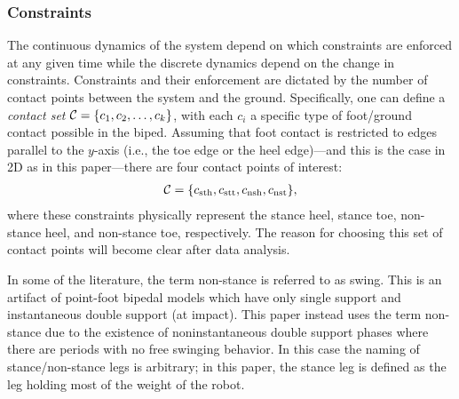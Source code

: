 \subsubsection{Constraints} The continuous dynamics of the system depend on which constraints are enforced at any given time while the discrete dynamics depend on the change in constraints.  Constraints and their enforcement are dictated by the number of contact points between the system and the ground. Specifically, one can define a {\em contact set} $\mathcal{C} = \{c_{1}, c_{2}, \ldots, c_{k}\}$, with each $c_i$ a specific type of foot/ground contact possible in the biped. Assuming that foot contact is restricted to edges parallel to the $y$-axis (i.e., the toe edge or the heel edge)---and this is the case in 2D as in this paper---there are four contact points of interest:
\begin{align}
  \mathcal{C} =  \{c_{\mathrm{sth}}, c_{\mathrm{stt}}, c_{\mathrm{nsh}} , c_{\mathrm{nst}}\},
\end{align}
where these constraints physically represent the stance heel, stance toe, non-stance heel, and non-stance toe, respectively. The reason for choosing this set of contact points will become clear after data analysis.

\begin{remark}
  In some of the literature, the term non-stance is referred to as swing. This is an artifact of point-foot bipedal models which have only single support and instantaneous double support (at impact). This paper instead uses the term non-stance due to the existence of noninstantaneous double support phases where there are periods with no free swinging behavior. In this case the naming of stance/non-stance legs is arbitrary; in this paper, the stance leg is defined as the leg holding most of the weight of the robot.
\end{remark}



